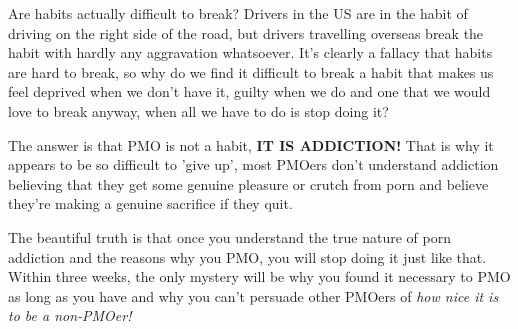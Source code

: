 \documentclass[easypeasy.tex]{subfiles}
\begin{document}
Are habits actually difficult to break? Drivers in the US are in the habit of driving on the right side of the road, but drivers travelling overseas break the habit with hardly any aggravation whatsoever. It's clearly a fallacy that habits are hard to break, so why do we find it difficult to break a habit that makes us feel deprived when we don't have it, guilty when we do and one that we would love to break anyway, when all we have to do is stop doing it?

The answer is that PMO is not a habit, \textbf{IT IS ADDICTION!} That is why it appears to be so difficult to 'give up', most PMOers don't understand addiction believing that they get some genuine pleasure or crutch from porn and believe they're making a genuine sacrifice if they quit.

The beautiful truth is that once you understand the true nature of porn addiction and the reasons why you PMO, you will stop doing it just like that. Within three weeks, the only mystery will be why you found it necessary to PMO as long as you have and why you can't persuade other PMOers of \textit{how nice it is to be a non-PMOer!}
\end{document}
